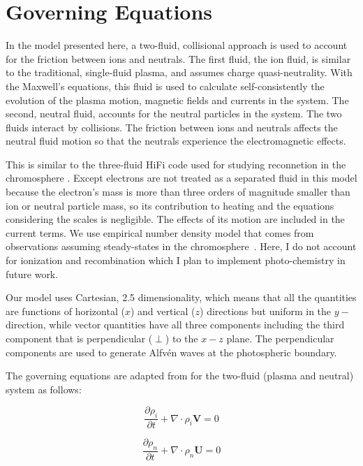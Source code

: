 \documentclass[12pt,upcase]{umlthesis}
\begin{document}
\section{Governing Equations}\label{sec:governingeq}

In the model presented here, a two-fluid, collisional approach is used to account for the friction between ions and neutrals. The first fluid, the ion fluid, is similar to the traditional, single-fluid plasma, and assumes charge quasi-neutrality. With the Maxwell's equations, this fluid is used to calculate self-consistently the evolution of the plasma motion, magnetic fields and currents in the system. The second, neutral fluid, accounts for the neutral particles in the system. The two fluids interact by collisions. The friction between ions and neutrals affects the neutral fluid motion so that the neutrals experience the electromagnetic effects. 

This is similar to the three-fluid HiFi code used for studying reconnetion in the chromosphere \citep{Leake2012}. Except electrons are not treated as a separated fluid in this model because the electron's mass is more than three orders of magnitude smaller than ion or neutral particle mass, so its contribution to heating and the equations considering the scales is negligible. The effects of its motion are included in the current terms. We use empirical number density model that comes from observations assuming steady-states in the chromosphere~\citep{AvrettLoeser2008}. Here, I do not account for ionization and recombination which I plan to implement photo-chemistry in future work.

Our model uses Cartesian, 2.5 dimensionality, which means that all the quantities are functions of horizontal ($x$) and vertical ($z$) directions but uniform in the $y-$ direction, while vector quantities  have all three components including the third component that is perpendicular ($\perp$) to the $x-z$ plane. The perpendicular components are used to generate Alfv\'en waves at the photospheric boundary. 

The governing equations are adapted from \citet{Tu2016} for the two-fluid (plasma and neutral) system as follows:

\begin{equation}
	\frac{\partial \rho_i}{\partial t} + \nabla \cdot \rho_i \textbf{V} = 0
\end{equation}

\begin{equation}
	\frac{\partial \rho_n}{\partial t} + \nabla \cdot \rho_n \textbf{U} = 0
\end{equation}
\end{document}

